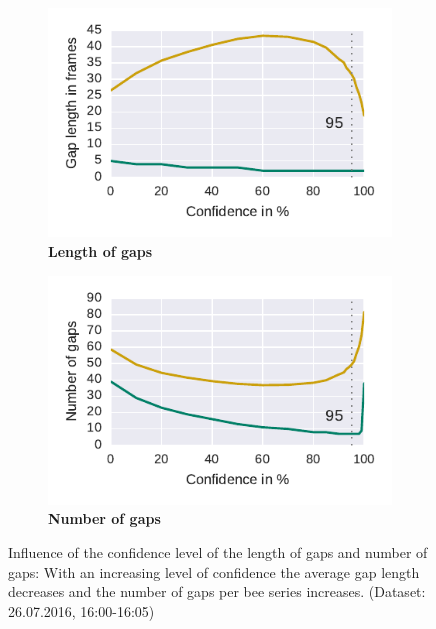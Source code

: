 \begin{figure}[htb]
	\centering
	\begin{subfigure}[b]{0.45\textwidth}
		\includegraphics[width=\textwidth]{Figures/gaplen}
		\caption[Length of gaps]{\textbf{Length of gaps}}
		\label{fig:gaplen}
	\end{subfigure}
	\begin{subfigure}[b]{0.45\textwidth}
		\includegraphics[width=\textwidth]{Figures/numgaps}
		\caption[Number of gaps]{\textbf{Number of gaps}}
		\label{fig:numgaps}
	\end{subfigure}
	\caption[Influence of Confidence Level on Gaps]{Influence of the confidence level of the length of gaps and number of gaps: With an increasing level of confidence the average gap length decreases and the number of gaps per bee series increases. (Dataset: 26.07.2016, 16:00-16:05)}
	\label{fig:gaps}
\end{figure}




